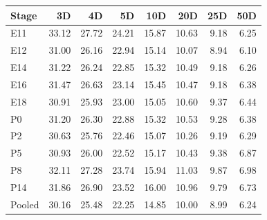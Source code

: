 \begin{tabular}{lrrrrrrr}\toprule
Stage & 3D & 4D & 5D & 10D & 20D & 25D & 50D \\ \midrule
E11 & 33.12 & 27.72 & 24.21 & 15.87 & 10.63 & 9.18 & 6.25 \\
E12 & 31.00 & 26.16 & 22.94 & 15.14 & 10.07 & 8.94 & 6.10 \\
E14 & 31.22 & 26.24 & 22.85 & 15.32 & 10.49 & 9.18 & 6.26 \\
E16 & 31.47 & 26.63 & 23.14 & 15.45 & 10.47 & 9.18 & 6.38 \\
E18 & 30.91 & 25.93 & 23.00 & 15.05 & 10.60 & 9.37 & 6.44 \\
P0 & 31.20 & 26.30 & 22.88 & 15.32 & 10.53 & 9.28 & 6.38 \\
P2 & 30.63 & 25.76 & 22.46 & 15.07 & 10.26 & 9.19 & 6.29 \\
P5 & 30.93 & 26.00 & 22.52 & 15.17 & 10.43 & 9.38 & 6.87 \\
P8 & 32.11 & 27.28 & 23.74 & 15.94 & 11.03 & 9.87 & 6.98 \\
P14 & 31.86 & 26.90 & 23.52 & 16.00 & 10.96 & 9.79 & 6.73 \\
\midrule
Pooled & 30.16 & 25.48 & 22.25 & 14.85 & 10.00 & 8.99 & 6.24 \\
\bottomrule\end{tabular}
